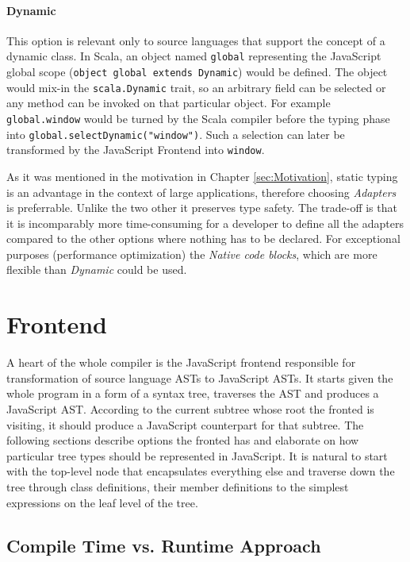 \documentclass[12pt,a4paper]{report}
\begin{document}
\paragraph{Dynamic} This option is relevant only to source languages that support the concept of a dynamic class. In Scala, an object named \texttt{global} representing the JavaScript global scope (\texttt{object global extends Dynamic}) would be defined. The object  would mix-in the \texttt{scala.Dynamic} \cite{ScalaDynamic} trait, so an arbitrary field can be selected or any method can be invoked on that particular object. For example \texttt{global.window} would be turned by the Scala compiler before the typing phase into \texttt{global.selectDynamic("window")}. Such a selection can later be transformed by the JavaScript Frontend into \texttt{window}.

As it was mentioned in the motivation in Chapter \ref{sec:Motivation}, static typing is an advantage in the context of large applications, therefore choosing {\it Adapters} is preferrable. Unlike the two other it preserves type safety. The trade-off is that it is incomparably more time-consuming for a developer to define all the adapters compared to the other options where nothing has to be declared. For exceptional purposes (performance optimization) the {\it Native code blocks}, which are more flexible than {\it Dynamic} could be used.

\section{Frontend}

A heart of the whole compiler is the JavaScript frontend responsible for transformation of source language ASTs to JavaScript ASTs. It starts given the whole program in a form of a syntax tree, traverses the AST and produces a JavaScript AST. According to the current subtree whose root the fronted is visiting, it should produce a JavaScript counterpart for that subtree. The following sections describe options the fronted has and elaborate on how particular tree types should be represented in JavaScript. It is natural to start with the top-level node that encapsulates everything else and traverse down the tree through class definitions, their member definitions to the simplest expressions on the leaf level of the tree.

\subsection{Compile Time vs. Runtime Approach}
\end{document}
